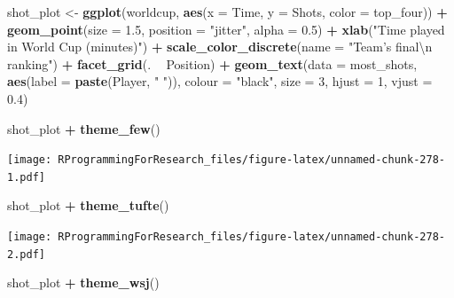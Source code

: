 \documentclass[]{book}
\makeatletter
\newenvironment{Shaded}{\begin{snugshade}}{\end{snugshade}}
\newcommand{\KeywordTok}[1]{\textcolor[rgb]{0.13,0.29,0.53}{\textbf{#1}}}
\newcommand{\DataTypeTok}[1]{\textcolor[rgb]{0.13,0.29,0.53}{#1}}
\newcommand{\DecValTok}[1]{\textcolor[rgb]{0.00,0.00,0.81}{#1}}
\newcommand{\FloatTok}[1]{\textcolor[rgb]{0.00,0.00,0.81}{#1}}
\newcommand{\CharTok}[1]{\textcolor[rgb]{0.31,0.60,0.02}{#1}}
\newcommand{\StringTok}[1]{\textcolor[rgb]{0.31,0.60,0.02}{#1}}
\newcommand{\OperatorTok}[1]{\textcolor[rgb]{0.81,0.36,0.00}{\textbf{#1}}}
\newcommand{\NormalTok}[1]{#1}
\newenvironment{kframe}{%
\medskip{}
\setlength{\fboxsep}{.8em}
 \def\at@end@of@kframe{}%
 \ifinner\ifhmode%
  \def\at@end@of@kframe{\end{minipage}}%
  \begin{minipage}{\columnwidth}%
 \fi\fi%
 \def\FrameCommand##1{\hskip\@totalleftmargin \hskip-\fboxsep
 \colorbox{shadecolor}{##1}\hskip-\fboxsep
     \hskip-\linewidth \hskip-\@totalleftmargin \hskip\columnwidth}%
 \MakeFramed {\advance\hsize-\width
   \@totalleftmargin\z@ \linewidth\hsize
   \@setminipage}}%
 {\par\unskip\endMakeFramed%
 \at@end@of@kframe}
\renewenvironment{Shaded}{\begin{kframe}}{\end{kframe}}
\theoremstyle{definition}
\theoremstyle{definition}
\theoremstyle{definition}
\theoremstyle{remark}
\makeatother
\begin{document}
\begin{Shaded}
\begin{Highlighting}[]
\NormalTok{shot_plot <-}\StringTok{ }\KeywordTok{ggplot}\NormalTok{(worldcup, }\KeywordTok{aes}\NormalTok{(}\DataTypeTok{x =}\NormalTok{ Time, }\DataTypeTok{y =}\NormalTok{ Shots,}
                     \DataTypeTok{color =}\NormalTok{ top_four)) }\OperatorTok{+}
\StringTok{        }\KeywordTok{geom_point}\NormalTok{(}\DataTypeTok{size =} \FloatTok{1.5}\NormalTok{, }\DataTypeTok{position =} \StringTok{"jitter"}\NormalTok{,}
                   \DataTypeTok{alpha =} \FloatTok{0.5}\NormalTok{)  }\OperatorTok{+}\StringTok{ }
\StringTok{        }\KeywordTok{xlab}\NormalTok{(}\StringTok{"Time played in World Cup (minutes)"}\NormalTok{) }\OperatorTok{+}\StringTok{ }
\StringTok{        }\KeywordTok{scale_color_discrete}\NormalTok{(}\DataTypeTok{name =} \StringTok{"Team's final}\CharTok{\textbackslash{}n}\StringTok{ ranking"}\NormalTok{) }\OperatorTok{+}\StringTok{ }
\StringTok{        }\KeywordTok{facet_grid}\NormalTok{(. }\OperatorTok{~}\StringTok{ }\NormalTok{Position) }\OperatorTok{+}\StringTok{ }
\StringTok{        }\KeywordTok{geom_text}\NormalTok{(}\DataTypeTok{data =}\NormalTok{ most_shots,}
                  \KeywordTok{aes}\NormalTok{(}\DataTypeTok{label =} \KeywordTok{paste}\NormalTok{(Player, }\StringTok{" "}\NormalTok{)),}
                  \DataTypeTok{colour =} \StringTok{"black"}\NormalTok{, }\DataTypeTok{size =} \DecValTok{3}\NormalTok{,}
                  \DataTypeTok{hjust =} \DecValTok{1}\NormalTok{, }\DataTypeTok{vjust =} \FloatTok{0.4}\NormalTok{)}

\NormalTok{shot_plot }\OperatorTok{+}\StringTok{ }\KeywordTok{theme_few}\NormalTok{()}
\end{Highlighting}
\end{Shaded}

\texttt{[image: RProgrammingForResearch\_files/figure-latex/unnamed-chunk-278-1.pdf]}

\begin{Shaded}
\begin{Highlighting}[]
\NormalTok{shot_plot }\OperatorTok{+}\StringTok{ }\KeywordTok{theme_tufte}\NormalTok{()}
\end{Highlighting}
\end{Shaded}

\texttt{[image: RProgrammingForResearch\_files/figure-latex/unnamed-chunk-278-2.pdf]}

\begin{Shaded}
\begin{Highlighting}[]
\NormalTok{shot_plot }\OperatorTok{+}\StringTok{ }\KeywordTok{theme_wsj}\NormalTok{()}
\end{Highlighting}
\end{Shaded}
\end{document}
